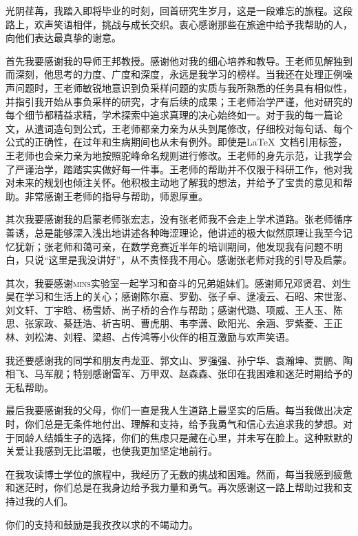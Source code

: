 

\begin{ack}

光阴荏苒，我踏入即将毕业的时刻，回首研究生岁月，这是一段难忘的旅程。这段路上，欢声笑语相伴，挑战与成长交织。衷心感谢那些在旅途中给予我帮助的人，向他们表达最真挚的谢意。

首先我要感谢我的导师王邦教授。感谢他对我的细心培养和教导。王老师见解独到而深刻，他思考的力度、广度和深度，永远是我学习的榜样。当我还在处理正例噪声问题时，王老师敏锐地意识到负采样问题的实质与我所熟悉的任务具有相似性，并指引我开始从事负采样的研究，才有后续的成果；王老师治学严谨，他对研究的每个细节都精益求精，学术探索中追求真理的决心始终如一。对于我的每一篇论文，从遣词造句到公式，王老师都亲力亲为从头到尾修改，仔细校对每句话、每个公式的正确性，在过年和生病期间也从未有例外。即使是\LaTeX~文档引用标签，王老师也会亲力亲为地按照驼峰命名规则进行修改。王老师的身先示范，让我学会了严谨治学，踏踏实实做好每一件事。王老师的帮助并不仅限于科研工作，他对我对未来的规划也倾注关怀。他积极主动地了解我的想法，并给予了宝贵的意见和帮助。非常感谢王老师的指导与帮助，师恩厚重。

其次我要感谢我的启蒙老师张宏志，没有张老师我不会走上学术道路。张老师循序善诱，总是能够深入浅出地讲述各种晦涩理论，他讲述的极大似然原理让我至今记忆犹新；张老师和蔼可亲，在数学竞赛近半年的培训期间，他发现我有问题不明白，只说“这里是我没讲好”，从不责怪我不用心。感谢张老师对我的引导及启蒙。

其次，我要感谢\textsc{mins}实验室一起学习和奋斗的兄弟姐妹们。感谢师兄邓贤君、刘生昊在学习和生活上的关心；感谢陈尔嘉、罗勤、张子卓、逯凌云、石昭、宋世澎、刘文轩、丁宇晗、杨雪娇、尚子桥的合作与帮助；感谢代璐、项威、王人玉、陈思、张家政、綦廷浩、祈吉明、曹虎朋、韦李潇、欧阳光、余涵、罗紫菱、王正林、刘松涛、刘程、梁超、占传鸿等小伙伴的相互激励与欢声笑语。

我还要感谢我的同学和朋友冉龙亚、郭文山、罗强强、孙宁华、袁瀚坤、贾鹏、陶相飞、马军舰；特别感谢雷军、万甲双、赵森森、张印在我困难和迷茫时期给予的无私帮助。


最后我要感谢我的父母，你们一直是我人生道路上最坚实的后盾。每当我做出决定时，你们总是无条件地付出、理解和支持，给予我勇气和信心去追求我的梦想。对于同龄人结婚生子的选择，你们的焦虑只是藏在心里，并未写在脸上。这种默默的关爱让我感到无比温暖，也使我更加坚定地前行。

在我攻读博士学位的旅程中，我经历了无数的挑战和困难。然而，每当我感到疲惫和迷茫时，你们总是在我身边给予我力量和勇气。再次感谢这一路上帮助过我和支持过我的人们。

你们的支持和鼓励是我孜孜以求的不竭动力。
\end{ack}
